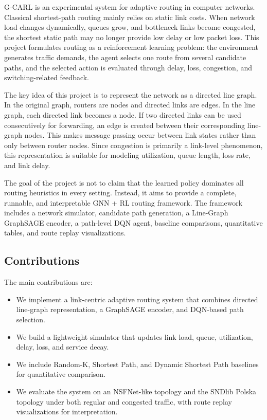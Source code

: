 \documentclass[9pt,a4paper,twocolumn,twoside]{rho-class/rho}
\begin{document}
G-CARL is an experimental system for adaptive routing in computer networks. Classical shortest-path routing mainly relies on static link costs. When network load changes dynamically, queues grow, and bottleneck links become congested, the shortest static path may no longer provide low delay or low packet loss. This project formulates routing as a reinforcement learning problem: the environment generates traffic demands, the agent selects one route from several candidate paths, and the selected action is evaluated through delay, loss, congestion, and switching-related feedback.

The key idea of this project is to represent the network as a directed line graph. In the original graph, routers are nodes and directed links are edges. In the line graph, each directed link becomes a node. If two directed links can be used consecutively for forwarding, an edge is created between their corresponding line-graph nodes. This makes message passing occur between link states rather than only between router nodes. Since congestion is primarily a link-level phenomenon, this representation is suitable for modeling utilization, queue length, loss rate, and link delay.

The goal of the project is not to claim that the learned policy dominates all routing heuristics in every setting. Instead, it aims to provide a complete, runnable, and interpretable GNN + RL routing framework. The framework includes a network simulator, candidate path generation, a Line-Graph GraphSAGE encoder, a path-level DQN agent, baseline comparisons, quantitative tables, and route replay visualizations.

\subsection*{Contributions}

The main contributions are:

\begin{itemize}
    \item We implement a link-centric adaptive routing system that combines directed line-graph representation, a GraphSAGE encoder, and DQN-based path selection.
    \item We build a lightweight simulator that updates link load, queue, utilization, delay, loss, and service decay.
    \item We include Random-K, Shortest Path, and Dynamic Shortest Path baselines for quantitative comparison.
    \item We evaluate the system on an NSFNet-like topology and the SNDlib Polska topology under both regular and congested traffic, with route replay visualizations for interpretation.
\end{itemize}
\end{document}
